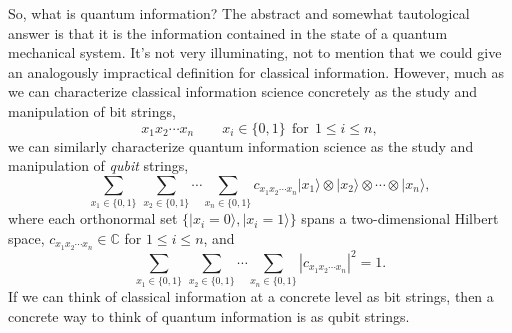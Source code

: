 \documentclass[a4paper,11pt]{article}
\newcommand{\ket}[1]{|#1\rangle}
\begin{document}
So, what is quantum information?
The abstract and somewhat tautological answer is that it is the information contained in the state of a quantum mechanical system.
It's not very illuminating, not to mention that we could give an analogously impractical definition for classical information.
However, much as we can characterize classical information science concretely as the study and manipulation of bit strings,
\begin{equation}
x_1 x_2 \cdots x_n \qquad x_i \in \{0,1\} ~~ \text{for} ~~ 1 \leq i \leq n,
\end{equation}
we can similarly characterize quantum information science as the study and manipulation of \emph{qubit} strings,
\begin{equation} \label{eq:qubit_string}
\sum_{x_1 \in \{0,1\}} \, \sum_{x_2 \in \{0,1\}} \cdots \sum_{x_n \in \{0,1\}} c_{x_1 x_2 \cdots x_n} \ket{x_1} \otimes \ket{x_2} \otimes \cdots \otimes \ket{x_n},
\end{equation}
where each orthonormal set $\{\ket{x_i = 0}, \ket{x_i = 1}\}$ spans a two-dimensional Hilbert space, $c_{x_1 x_2 \cdots x_n} \in \mathbb{C}$ for $1 \leq i \leq n$, and
\begin{equation}
\sum_{x_1 \in \{0,1\}} \, \sum_{x_2 \in \{0,1\}} \cdots \sum_{x_n \in \{0,1\}} |c_{x_1 x_2 \cdots x_n}|^2 = 1.
\end{equation}
If we can think of classical information at a concrete level as bit strings, then a concrete way to think of quantum information is as qubit strings.
\end{document}

